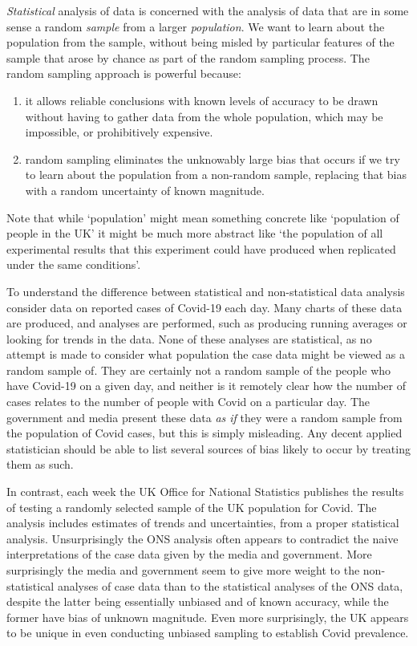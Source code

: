 \documentclass[10pt] {article}
\theoremstyle{definition}
\begin{document}
{\em Statistical} analysis of data is concerned with the analysis of data that are in some sense a random {\em sample} from a larger {\em population}. We want to learn about the population from the sample, without being misled by particular features of the sample that arose by chance as part of the random sampling process. The random sampling approach is powerful because: 
\begin{enumerate}
\item it allows reliable conclusions with known levels of accuracy to be drawn without having to gather data from the whole population, which may be impossible, or prohibitively expensive.       
\item random sampling eliminates the unknowably large bias that occurs if we try to learn about the population from a non-random sample, replacing that bias with a random uncertainty of known magnitude.   
\end{enumerate}
Note that while `population' might mean something concrete like `population of people in the UK' it might be much more abstract like `the population of all experimental results that this experiment could have produced when replicated under the same conditions'. 

To understand the difference between statistical and non-statistical data analysis consider data on reported cases of Covid-19 each day. Many charts of these data are produced, and analyses are performed, such as producing running averages or looking for trends in the data. None of these analyses are statistical, as no attempt is made to consider what population the case data might be viewed as a random sample of. They are certainly not a random sample of the people who have Covid-19 on a given day, and neither is it remotely clear how the number of cases relates to the number of people with Covid on a particular day.  The government and media present these data {\em as if} they were a random sample from the population of Covid cases, but this is simply misleading. Any decent applied statistician should be able to list several sources of bias likely to occur by treating them as such. 

In contrast, each week the UK Office for National Statistics publishes the results of testing a randomly selected sample of the UK population for Covid. The analysis includes estimates of trends and uncertainties, from a proper statistical analysis. Unsurprisingly the ONS analysis often appears to contradict the naive interpretations of the case data given by the media and government. More surprisingly the media and government seem to give more weight to the non-statistical analyses of case data than to the statistical analyses of the ONS data, despite the latter being essentially unbiased and of known accuracy, while the former have bias of unknown magnitude. Even more surprisingly, the UK appears to be unique in even conducting unbiased sampling to establish Covid prevalence.
\end{document}
